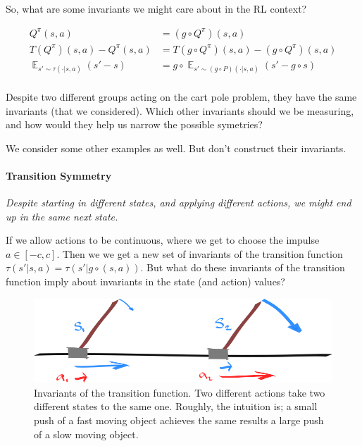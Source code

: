 So, what are some invariants we might care about in the RL context?

\begin{align*}
Q^\pi(s, a) &= (g \circ Q^{\pi})(s, a) \tag{expected return}\\
T(Q^\pi)(s,a) - Q^\pi(s,a) &=T(g \circ Q^\pi)(s, a) - (g \circ Q^\pi)(s,a) \tag{Bellman residual}\\
\mathop{\mathbb E}_{s' \sim \tau(\cdot| s, a)} (s' - s) &= g \circ \mathop{\mathbb E}_{s' \sim (g \circ P)(\cdot| s, a)} (s' - g \circ s) \tag{change in state}\\
\end{align*}

Despite two different groups acting on the cart pole problem, they have the same invariants (that we considered).
Which other invariants should we be measuring, and how would they help us narrow the possible symetries?

We consider some other examples as well. But don't construct their invariants.

\paragraph{Transition Symmetry}

\begin{displayquote}
  \textit{Despite starting in different states, and applying different actions, we might end up in the same next state.}
\end{displayquote}

If we allow actions to be continuous, where we get to choose the impulse $a \in [-c, c]$.
Then we we get a new set of invariants of the transition function $\tau(s'|s, a) = \tau(s'|g\circ (s, a))$.
But what do these invariants of the transition function imply about invariants in the state (and action) values?

\begin{figure}[!h]
\centering
\includegraphics[width=1\textwidth,height=0.25\textheight]{../../pictures/drawings/cart-pole-state.png}
\caption{Invariants of the transition function. Two different actions take two different states to the same one.
Roughly, the intuition is; a small push of a fast moving object achieves the same results a large push of a slow moving object.}
\end{figure}


